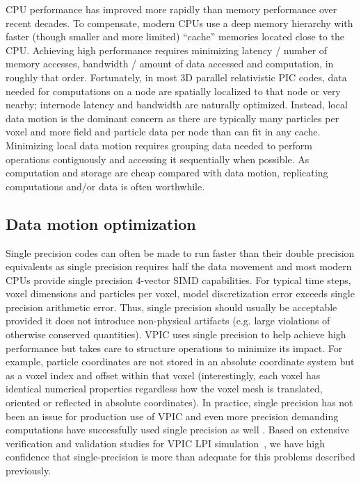 \documentclass[letter,10pt]{article}
\begin{document}
CPU performance has improved more rapidly than memory performance over
recent decades.  To compensate, modern CPUs use a deep memory
hierarchy with faster (though smaller and more limited) ``cache''
memories located close to the CPU.  Achieving high performance
requires minimizing latency / number of memory accesses, bandwidth /
amount of data accessed and computation, in roughly that order.
Fortunately, in most 3D parallel relativistic PIC codes, data needed
for computations on a node are spatially localized to that node or
very nearby; internode latency and bandwidth are naturally optimized.
Instead, local data motion is the dominant concern as there are
typically many particles per voxel and more field and particle data
per node than can fit in any cache.  Minimizing local data motion
requires grouping data needed to perform operations contiguously and
accessing it sequentially when possible.  As computation and storage
are cheap compared with data motion, replicating computations and/or
data is often worthwhile.

\subsection{Data motion optimization}

Single precision codes can often be made to run faster than their
double precision equivalents as single precision requires half the
data movement and most modern CPUs provide single precision 4-vector
SIMD capabilities.  For typical time steps, voxel dimensions and
particles per voxel, model discretization error exceeds single
precision arithmetic error.  Thus, single precision should usually be
acceptable provided it does not introduce non-physical artifacts
(e.g. large violations of otherwise conserved quantities).  VPIC uses
single precision to help achieve high performance but takes care to
structure operations to minimize its impact.  For example, particle
coordinates are not stored in an absolute coordinate system but as a
voxel index and offset within that voxel (interestingly, each voxel
has identical numerical properties regardless how the voxel mesh is
translated, oriented or reflected in absolute coordinates).  In
practice, single precision has not been an issue for production use of
VPIC and even more precision demanding computations have successfully
used single precision as well
\cite{Bowers_et_al_2006,Langou_et_al_2006,Lippert_et_al_2007}.
Based on extensive verification and validation studies for VPIC LPI
simulation~\cite{Yin_et_al_Phys_Plasmas_2006}, we have high confidence
that single-precision is more than adequate for this problems
described previously.
\end{document}
